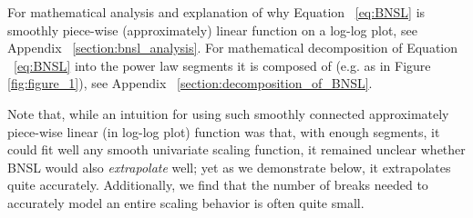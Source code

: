 \documentclass{article} %
\begin{document}
\vspace{-1.2mm}

For mathematical analysis and explanation of why Equation ~\ref{eq:BNSL} is smoothly piece-wise (approximately) linear function on a log-log plot, see Appendix ~\ref{section:bnsl_analysis}. For mathematical decomposition of Equation ~\ref{eq:BNSL} into the power law segments it is composed of (e.g. as in Figure \ref{fig:figure_1}), see Appendix ~\ref{section:decomposition_of_BNSL}.

\vspace{-0.5mm}

Note that, while an intuition for using such smoothly connected approximately piece-wise linear (in log-log plot) function was that, with enough segments, it could fit well any smooth univariate scaling function, it remained unclear whether BNSL would also {\em extrapolate} well; yet as we demonstrate below, it extrapolates quite accurately. Additionally, we find that the number of breaks needed to accurately model an entire scaling behavior is often quite small.









\end{document}
